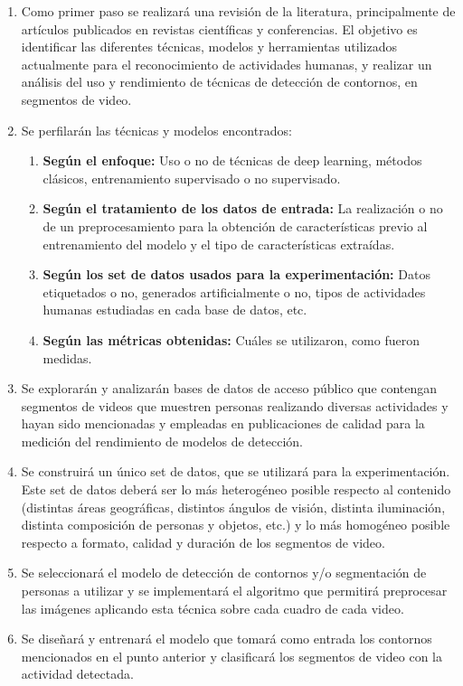\begin{enumerate}
	\item Como primer paso se realizará una revisión de la literatura, principalmente de artículos publicados en revistas científicas y conferencias. El objetivo es identificar las diferentes técnicas, modelos y herramientas utilizados actualmente para el reconocimiento de actividades humanas, y realizar un análisis del uso y rendimiento de técnicas de detección de contornos, en segmentos de video.
	\item Se perfilarán las técnicas y modelos encontrados:
	\begin{enumerate}[label=\alph*]
		\item {\bf Según el enfoque:} Uso o no de técnicas de deep learning, métodos clásicos, entrenamiento supervisado o no supervisado.
		\item {\bf Según el tratamiento de los datos de entrada:} La realización o no de un preprocesamiento para la obtención de características previo al entrenamiento del modelo y el tipo de características extraídas.
		\item {\bf Según los set de datos usados para la experimentación:} Datos etiquetados o no, generados artificialmente o no, tipos de actividades humanas estudiadas en cada base de datos, etc.
		\item {\bf Según las métricas obtenidas:} Cuáles se utilizaron, como fueron medidas.
	\end{enumerate}
	\item Se explorarán y analizarán bases de datos de acceso público que contengan segmentos de videos que muestren personas realizando diversas actividades y hayan sido mencionadas y empleadas en publicaciones de calidad para la medición del rendimiento de modelos de detección.
	\item Se construirá un único set de datos, que se utilizará para la experimentación. Este set de datos deberá ser lo más heterogéneo posible respecto al contenido (distintas áreas geográficas, distintos ángulos de visión, distinta iluminación, distinta composición de personas y objetos, etc.) y lo más homogéneo posible respecto a formato, calidad y duración de los segmentos de video.
	\item Se seleccionará el modelo de detección de contornos y/o segmentación de personas a utilizar y se implementará el algoritmo que permitirá preprocesar las imágenes aplicando esta técnica sobre cada cuadro de cada video.
	\item Se diseñará y entrenará el modelo que tomará como entrada los contornos mencionados en el punto anterior y clasificará los segmentos de video con la actividad detectada.

\end{enumerate}
